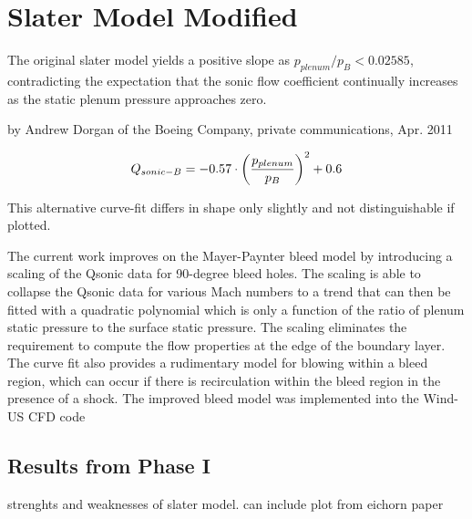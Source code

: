 \section{Slater Model Modified}

The original slater model yields a positive slope as $p_{plenum}/p_B < 0.02585 $, contradicting the expectation that the sonic flow coefficient continually increases as the static plenum pressure approaches zero.

by Andrew Dorgan of the Boeing Company, private communications, Apr. 2011

$$ Q_{sonic-B} = -0.57 \cdot \qty(\frac{p_{plenum}}{p_B})^2 + 0.6 $$

This alternative curve-fit differs in shape only slightly and not distinguishable if plotted.







The current work improves on the Mayer-Paynter bleed model by introducing a scaling of the Qsonic data for 90-degree bleed holes. The scaling is able to collapse the Qsonic data for various Mach numbers to a trend that can then be fitted with a quadratic polynomial which is only a function of the ratio of plenum static pressure to the surface static pressure. The scaling eliminates the requirement to compute the flow properties at the edge of the boundary layer. The curve fit also provides a rudimentary model for blowing within a bleed region, which can occur if there is recirculation within the bleed region in the presence of a shock. The improved bleed model was implemented into the Wind-US CFD code

\subsection{Results from Phase I}
strenghts and weaknesses of slater model. can include plot from eichorn paper


